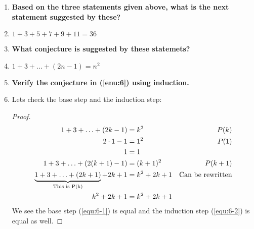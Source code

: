 \documentclass[english,11pt,a4paper]{article}
\begin{document}
\begin{enumerate}[a]
\item \textbf{Based on the three statements given above, what is the next statement suggested by these?}
\item[] $1+3+5+7+9+11 = 36$
\item \label{enu:6}\textbf{What conjecture is suggested by these statemets?}
\item[] $1+3+\ldots+(2n-1) = n^2$
\item \textbf{Verify the conjecture in (\ref{enu:6}) using induction.}
\item[] Lets check the base step and the induction step:
\begin{proof}

\begin{align}
1+3+\ldots+(2k-1) &= k^2 & P(k)\\
2\cdot 1-1&=1^2 & P(1) \\
1&=1 \label{equ:6-1}\\
1+3+\ldots+(2(k+1)-1) &= (k+1)^2 & P(k+1)\\
\underbrace{1+3+\ldots+(2k+1)}_{\mathclap{\text{This is P(k)}}}+2k+1 &= k^2+2k+1 & \text{Can be rewritten}\\
	k^2+2k+1 &= k^2+2k+1 \label{equ:6-2}
\end{align}
We see the base step (\ref{equ:6-1}) is equal and the induction step (\ref{equ:6-2}) is equal as well.
\end{proof}
\end{enumerate}
\end{document}
